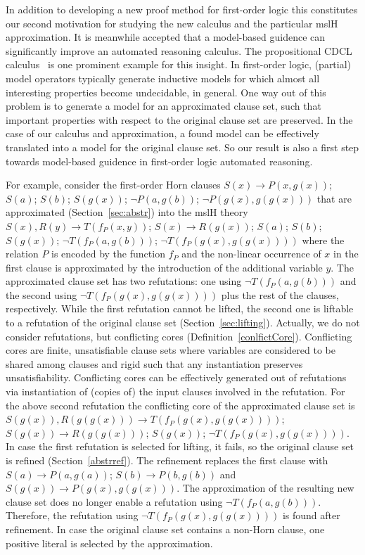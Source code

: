\documentclass{llncs}
\begin{document}
In addition to developing a new proof method for first-order logic this constitutes our second motivation
for studying the new calculus and the particular mslH approximation. It is meanwhile accepted that
a model-based guidence can significantly improve an automated reasoning calculus. The propositional
CDCL calculus~\cite{NieuwenhuisEtAl06} 
is one prominent example for this insight. In first-order logic, (partial) model operators
typically generate inductive models for which almost all interesting properties become undecidable,
in general. One way out of this problem is to generate a model for an approximated clause set, such
that important properties with respect to the original clause set are preserved. In the case of our calculus and approximation, a found model
can be effectively translated into a model for the original clause set. So our result is also a first
step towards model-based guidence in first-order logic automated reasoning.

For example, consider the first-order Horn clauses 
$S(x) \rightarrow P(x,g(x))$; $ S(a)$; $ S(b)$; $ S(g(x))$; $ \neg P(a, g(b))$; $ \neg P(g(x), g(g(x)))$
that are approximated (Section~\ref{sec:abstr}) into the mslH theory
$S(x), R(y) \rightarrow T(f_P(x,y))$; $ S(x) \rightarrow R(g(x))$; $ S(a)$; $ S(b)$; $S(g(x))$; $ \neg T(f_P(a, g(b)))$; $ \neg T(f_P(g(x), g(g(x))))$
where the relation $P$ is encoded by the function $f_P$ and the non-linear occurrence of $x$ in the first
clause is approximated by the introduction of the additional variable $y$. The approximated clause set
has two refutations: one using $\neg T(f_P(a, g(b)))$ and the second using $\neg T(f_P(g(x), g(g(x))))$ plus
the rest of the clauses, respectively. While the first refutation cannot be lifted, the second one is liftable to 
a refutation of the original clause set (Section~\ref{sec:lifting}). Actually, we do not consider refutations, but conflicting cores (Definition~\ref{conlfictCore}).
Conflicting cores are finite, unsatisfiable clause sets where variables are considered to be shared among clauses and rigid such that
any instantiation preserves unsatisfiability. Conflicting cores can be effectively generated out of refutations via instantiation
of (copies of) the input clauses involved in the refutation.
For the above second refutation the conflicting core of the approximated clause set is
$S(g(x)), R(g(g(x))) \rightarrow T(f_P(g(x),g(g(x))))$; $ S(g(x)) \rightarrow R(g(g(x)))$; $ S(g(x))$; $ \neg T(f_P(g(x), g(g(x))))$.\newline
In case the first refutation is selected for lifting, it fails, so the original clause set is refined (Section~\ref{abstrref}). The refinement
replaces the first clause with\newline
$S(a) \rightarrow P(a,g(a))$; $ S(b) \rightarrow P(b,g(b))$ and $ S(g(x)) \rightarrow P(g(x),g(g(x)))$.\newline
The approximation of the resulting new clause set does no longer enable a refutation using $\neg T(f_P(a, g(b)))$. Therefore, the refutation using $\neg T(f_P(g(x), g(g(x))))$ is found after refinement.
In case the original clause set contains a non-Horn clause, one positive literal is selected by the approximation.
\end{document}
